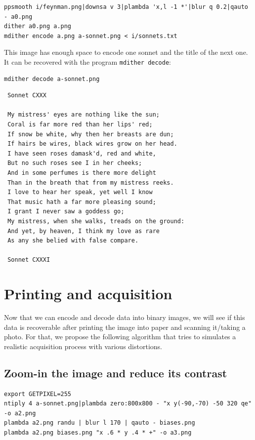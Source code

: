 \begin{verbatim}
ppsmooth i/feynman.png|downsa v 3|plambda 'x,l -1 *'|blur q 0.2|qauto - a0.png
dither a0.png a.png
mdither encode a.png a-sonnet.png < i/sonnets.txt
\end{verbatim}

This image has enough space to encode one sonnet and the title of
the next one.  It can be
recovered with the program \verb+mdither decode+:

 \begin{verbatim}
mdither decode a-sonnet.png
\end{verbatim} %

 \begin{verbatim}
 Sonnet CXXX

 My mistress' eyes are nothing like the sun;
 Coral is far more red than her lips' red;
 If snow be white, why then her breasts are dun;
 If hairs be wires, black wires grow on her head.
 I have seen roses damask'd, red and white,
 But no such roses see I in her cheeks;
 And in some perfumes is there more delight
 Than in the breath that from my mistress reeks.
 I love to hear her speak, yet well I know
 That music hath a far more pleasing sound;
 I grant I never saw a goddess go;
 My mistress, when she walks, treads on the ground:
 And yet, by heaven, I think my love as rare
 As any she belied with false compare.

 Sonnet CXXXI

\end{verbatim} %


\section{Printing and acquisition}

Now that we can encode and decode data into binary images, we will see if
this data is recoverable after printing the image into paper and scanning
it/taking a photo.  For that, we propose the following algorithm that tries
to simulates a realistic acquisition process with various distortions.

\clearpage
\subsection{Zoom-in the image and reduce its contrast}

\begin{verbatim}
export GETPIXEL=255
ntiply 4 a-sonnet.png|plambda zero:800x800 - "x y(-90,-70) -50 320 qe" -o a2.png
plambda a2.png randu | blur l 170 | qauto - biases.png
plambda a2.png biases.png "x .6 * y .4 * +" -o a3.png
\end{verbatim}
\begin{gallery}
\end{gallery}


